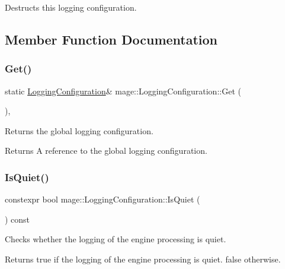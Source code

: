 Destructs this logging configuration. 

\subsection{Member Function Documentation}
\mbox{\label{classmage_1_1_logging_configuration_a2362fda9a66570dbb7cd77f9f64af9fe}} 
\subsubsection{\texorpdfstring{Get()}{Get()}}
{\footnotesize\ttfamily static \mbox{\hyperlink{classmage_1_1_logging_configuration}{Logging\+Configuration}}\& mage\+::\+Logging\+Configuration\+::\+Get (\begin{DoxyParamCaption}{ }\end{DoxyParamCaption})\hspace{0.3cm}{\ttfamily [static]}, {\ttfamily [noexcept]}}

Returns the global logging configuration.

\begin{DoxyReturn}{Returns}
A reference to the global logging configuration. 
\end{DoxyReturn}
\mbox{\label{classmage_1_1_logging_configuration_a1096a1ef5f9237fb76fc5937ac1a1210}} 
\subsubsection{\texorpdfstring{Is\+Quiet()}{IsQuiet()}}
{\footnotesize\ttfamily constexpr bool mage\+::\+Logging\+Configuration\+::\+Is\+Quiet (\begin{DoxyParamCaption}{ }\end{DoxyParamCaption}) const\hspace{0.3cm}{\ttfamily [noexcept]}}

Checks whether the logging of the engine processing is quiet.

\begin{DoxyReturn}{Returns}
{\ttfamily true} if the logging of the engine processing is quiet. {\ttfamily false} otherwise. 
\end{DoxyReturn}
\mbox{\label{classmage_1_1_logging_configuration_abd81834c6938be1b32a7bd6eb08d5242}} 
